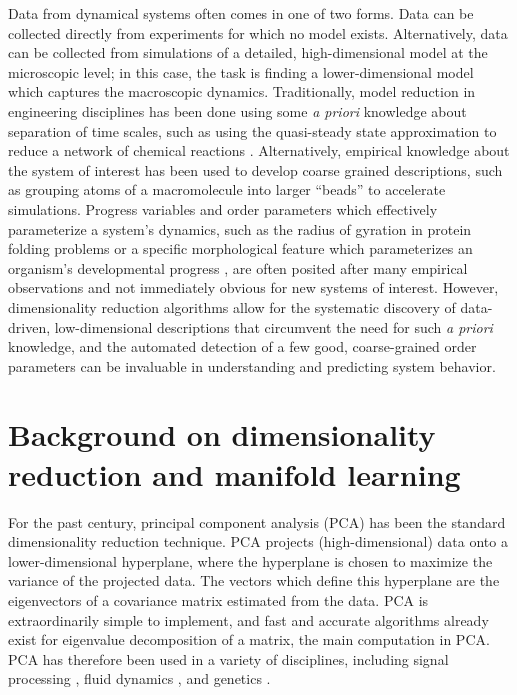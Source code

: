 Data from dynamical systems often comes in one of two forms. 
%
Data can be collected directly from experiments for which no model exists. 
%
Alternatively, data can be collected from simulations of a detailed, high-dimensional model at the microscopic level; in this case, the task is finding a lower-dimensional model which captures the macroscopic dynamics. 
%
Traditionally, model reduction in engineering disciplines has been done using some {\em a priori} knowledge about separation of time scales,
such as using the quasi-steady state approximation to reduce a network of chemical reactions \cite{bowen1963singular}.
%
Alternatively, empirical knowledge about the system of interest has been used to develop coarse grained descriptions, such as grouping atoms of a macromolecule into larger ``beads'' to accelerate simulations\cite{monticelli2008martini, spiga2013electrostatic,izvekov2005systematic, saunders2013coarse}.
%
Progress variables and order parameters which effectively parameterize a system's dynamics, such as the radius of gyration in protein folding problems \cite{...} or a specific morphological feature which parameterizes an organism's developmental progress \cite{...}, are often posited after many empirical observations and not immediately obvious for new systems of interest. 
%
However, dimensionality reduction algorithms allow for the systematic discovery of data-driven, low-dimensional descriptions that circumvent the need for such {\em a priori} knowledge, and the automated detection of a few good, coarse-grained
order parameters can be invaluable in understanding and predicting system behavior.
%


\section{Background on dimensionality reduction and manifold learning} \label{sec:background}


For the past century, principal component analysis (PCA) \cite{shlens2005tutorial} has been the standard dimensionality reduction technique.
%
PCA projects (high-dimensional) data onto a lower-dimensional hyperplane, where the hyperplane is chosen to maximize the variance of the projected data. 
%
The vectors which define this hyperplane are the eigenvectors of a covariance matrix estimated from the data. 
%
PCA is extraordinarily simple to implement, and fast and accurate algorithms already exist for eigenvalue decomposition of a matrix, the main computation in PCA.
%
PCA has therefore been used in a variety of disciplines, including signal processing \cite{...},  fluid dynamics \cite{...}, and genetics \cite{...}. 

